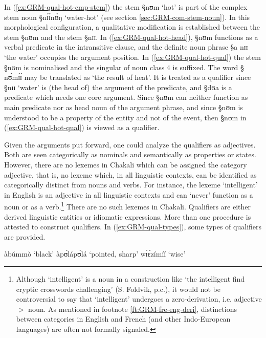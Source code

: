 In (\ref{ex:GRM-qual-hot-cmp-stem}) the stem {\S nʊm} `hot' is part of the
complex stem noun {\S nɪ́ɪ́nʊ̀ŋ} `water-hot' (see section
\ref{sec:GRM-com-stem-noun}).  In this morphological configuration, a
qualitative
modification is  established  between the stem {\S nʊm} and the stem {\S nɪɪ}.
In (\ref{ex:GRM-qual-hot-head}), {\S nʊm}  functions as a verbal predicate in
the
intransitive clause, and the definite noun phrase {\S a nɪɪ} `the water'
occupies
the argument position. In (\ref{ex:GRM-qual-hot-qual}) the stem {\S nʊm} is
nominalised and the singular of  noun class 4 is suffixed. The word {\S
nʊ́mɪ́ɪ́} may be translated as  `the result of heat'. It is treated as a
qualifier since {\S nɪɪ} `water' is  (the head of) the argument of the
predicate, and {\S dʊa} is a predicate which needs   one core argument. Since 
{\S nʊm}  can neither function as main predicate nor as head noun of the
argument phrase, and since {\S nʊm}  is understood to be a property of the
entity
and not of the event, then {\S nʊm} in (\ref{ex:GRM-qual-hot-qual}) is viewed as
a qualifier.


Given the arguments put forward, one could analyze the qualifiers as adjectives.
Both are  seen  categorically as nominals  and semantically as properties or
states.  However, there are no lexemes in Chakali  which can be assigned
the category adjective, that is, no lexeme which, in all  linguistic contexts,
can be identified as categorically distinct from nouns and verbs.  For instance,
the lexeme `intelligent' in English is an adjective in all linguistic contexts
and can `never' function as a noun or as  a verb.\footnote{Although
`intelligent' is a noun in a construction like `the
intelligent find cryptic crosswords challenging' (S. Foldvik, p.c.),  it would
not be
controversial to say that `intelligent'  undergoes a zero-derivation, i.e.
adjective $>$ noun.  As mentioned in footnote \ref{ft:GRM-fre-eng-deri},
distinctions between categories in English and French (and other Indo-European
languages) are often not formally signaled. }  There are no such lexemes in
Chakali. Qualifiers are
either derived
linguistic entities or idiomatic
expressions. More than one procedure is attested to construct qualifiers. In
(\ref{ex:GRM-qual-types}),   some types of qualifiers are provided.

\begin{exe}
\ex\label{ex:GRM-qual-types}
 \begin{xlist}
 \ex\label{ex:GRM-qual-t0} àbúmmò `black'  
     \ex\label{ex:GRM-qual-t1} àpʊ́lápʊ́lá `pointed, sharp'
  \ex\label{ex:GRM-qual-t2}  wɪ̀ɛ́zímíí  `wise' 


 \end{xlist}
\end{exe}


